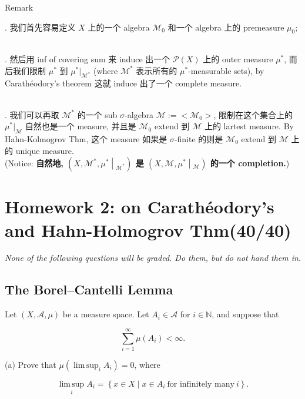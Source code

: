 \documentclass{qlnotes-export}
\begin{document}
\begin{qlremark}{Remark}

. 我们首先容易定义 \(X\) 上的一个 algebra \(\mathcal{M}_{0}\) 和一个 algebra 上的 premeasure \(\mu_{0}\);\\
\strut \\
. 然后用 inf of covering sum 来 induce 出一个 \(\mathcal{P}(X)\) 上的 outer measure \(\mu^{\ast}\), 而后我们限制 \(\mu^{\ast}\) 到 \(\mu^{\ast}|_{\mathcal{M}^{\ast}}\) (where \(\mathcal{M}^{\ast}\) 表示所有的 \(\mu^{\ast}\)-measurable sets), by Carathéodory's theorem 这就 induce 出了一个 complete measure.\\
\strut \\
. 我们可以再取 \(\mathcal{M}^{\ast}\) 的一个 sub \(\sigma\)-algebra \(\mathcal{M} := < \mathcal{M}_{0} >\), 限制在这个集合上的 \(\mu^{\ast}|_{\mathcal{M}}\) 自然也是一个 measure, 并且是 \(\mathcal{M}_{0}\) extend 到 \(\mathcal{M}\) 上的 lartest measure. By Hahn-Kolmogrov Thm, 这个 measure 如果是 \(\sigma\)-finite 的则是 \(\mathcal{M}_{0}\) extend 到 \(\mathcal{M}\) 上的 unique measure.\\
(Notice: \textbf{自然地, \(\left. (X,\mathcal{M}^{\ast},\mu^{\ast} \middle| {}_{\mathcal{M}^{\ast}}) \right.\) 是 \(\left. (X,\mathcal{M},\mu^{\ast} \middle| {}_{\mathcal{M}}) \right.\) 的一个 completion.})

\end{qlremark}

\chapter{Homework 2: on Carathéodory's and Hahn-Holmogrov Thm(40/40)}\label{homework-2-on-carathuxe9odorys-and-hahn-holmogrov-thm4040}

\emph{None of the following questions will be graded. Do them, but do not hand them in}.

\section{The Borel--Cantelli Lemma}\label{the-borelcantelli-lemma}

Let \((X,\mathcal{A},\mu)\) be a measure space. Let \(A_{i} \in \mathcal{A}\) for \(i \in {\mathbb{N}}\), and suppose that

\[\sum\limits_{i = 1}^{\infty}\mu(A_{i}) < \infty.\]

(a) Prove that \(\mu(\operatorname{lim\, sup}_{i}A_{i}) = 0\), where

\[\operatorname{lim\, sup}\limits_{i}A_{i} = \left\{ {x \in X \mid x \in A_{i}\ \text{for infinitely many}\ i} \right\}.\]
\end{document}
